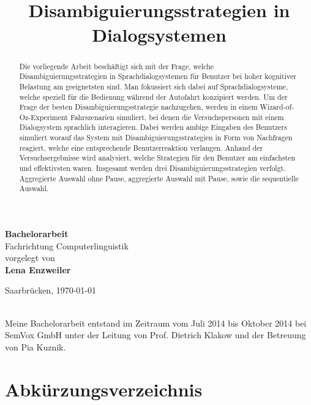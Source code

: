 \documentclass[12pt,a4paper]{scrartcl}
\title{$\,$\\  Disambiguierungsstrategien in Dialogsystemen}
\date{}
\author{}
\begin{document}

\maketitle
\sffamily
\begin{center}
\huge
\textbf{Bachelorarbeit}\\
\vfill
\LARGE
Fachrichtung Computerlinguistik\\
\vfill
\normalsize
vorgelegt von\\
\Large
\textbf{Lena Enzweiler}\\
\vfill


\normalsize
Saarbrücken,
\today

\end{center}

\thispagestyle{empty}
\rmfamily
\cleardoublepage
$\,$\\
\vfill
Meine Bachelorarbeit entstand im Zeitraum vom Juli 2014 bis Oktober 2014 bei SemVox GmbH unter der Leitung von Prof. Dietrich Klakow und der Betreuung von Pia Kuznik.


\cleardoublepage

\tableofcontents
\cleardoublepage

\listoffigures
\cleardoublepage

\listoftables
\cleardoublepage
{}
\section*{Abkürzungsverzeichnis}  

\cleardoublepage


\renewcommand{\abstractname}{Abstract}
\subsection*{}  
\begin{abstract}
Die vorliegende Arbeit beschäftigt sich mit der Frage, welche Disambiguierungsstrategien in Sprachdialogsystemen für Benutzer bei hoher kognitiver Belastung am geeignetsten sind. Man fokussiert sich dabei auf Sprachdialogsysteme, welche speziell für die Bedienung während der Autofahrt konzipiert werden. Um der Frage der besten Disambiguierungsstrategie nachzugehen, werden in einem Wizard-of-Oz-Experiment Fahrszenarien simuliert, bei denen die Versuchspersonen mit einem Dialogsystem sprachlich interagieren. Dabei werden ambige Eingaben des Benutzers simuliert worauf das System mit Disambiguierungsstrategien in Form von Nachfragen reagiert, welche eine entsprechende Benutzerreaktion verlangen. Anhand der Versuchsergebnisse wird analysiert, welche Strategien für den Benutzer am einfachsten und effektivsten waren. Insgesamt werden drei Disambiguierungsstrategien verfolgt. Aggregierte Auswahl ohne Pause, aggregierte Auswahl mit Pause, sowie die sequentielle Auswahl. 
\end{abstract}
\newpage
\end{document}
